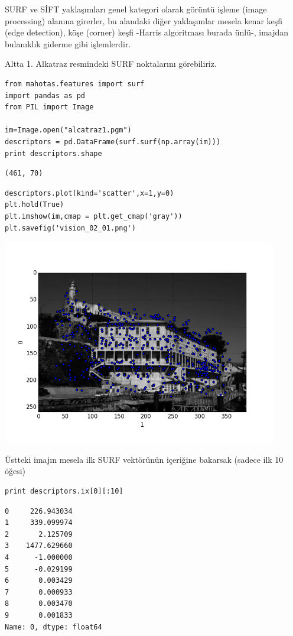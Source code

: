 \documentclass[12pt,fleqn]{article}\usepackage{../../common}
\begin{document}
SURF ve SİFT yaklaşımları genel kategori olarak görüntü işleme (image
processing) alanına girerler, bu alandaki diğer yaklaşımlar mesela kenar
keşfi (edge detection), köşe (corner) keşfi -Harris algoritması burada
ünlü-, imajdan bulanıklık giderme gibi işlemlerdir. 

Altta 1. Alkatraz resmindeki SURF noktalarını görebiliriz.

\begin{verbatim}
from mahotas.features import surf
import pandas as pd
from PIL import Image

im=Image.open("alcatraz1.pgm")
descriptors = pd.DataFrame(surf.surf(np.array(im)))
print descriptors.shape
\end{verbatim}

\begin{verbatim}
(461, 70)
\end{verbatim}

\begin{verbatim}
descriptors.plot(kind='scatter',x=1,y=0)
plt.hold(True)
plt.imshow(im,cmap = plt.get_cmap('gray'))
plt.savefig('vision_02_01.png')
\end{verbatim}

\includegraphics[height=9cm]{vision_01_01.png}

Üstteki imajın mesela ilk SURF vektörünün içeriğine bakarsak (sadece ilk 10
öğesi)

\begin{verbatim}
print descriptors.ix[0][:10]
\end{verbatim}

\begin{verbatim}
0     226.943034
1     339.099974
2       2.125709
3    1477.629660
4      -1.000000
5      -0.029199
6       0.003429
7       0.000933
8       0.003470
9       0.001833
Name: 0, dtype: float64
\end{verbatim}
\end{document}

